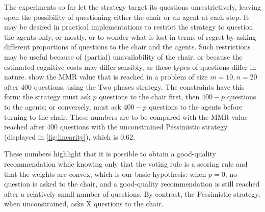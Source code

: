 \documentclass[sigconf, anonymous]{aamas}
\begin{document}

The experiments so far let the strategy target its questions unrestrictively, leaving open the possibility of questioning either the chair or an agent at each step. It may be desired in practical implementations to restrict the strategy to question the agents only, or mostly, or to wonder what is lost in terms of regret by asking different proportions of questions to the chair and the agents. Such restrictions may be useful because of (partial) unavailability of the chair, or because the estimated cognitive costs may differ sensibly, as these types of questions differ in nature.  show the MMR value that is reached in a problem of size $m = 10, n = 20$ after $400$ questions, using the Two phases strategy. The constraints have this form: the strategy must ask $p$ questions to the chair first, then $400 - p$ questions to the agents; or conversely, must ask $400 - p$ questions to the agents before turning to the chair. These numbers are to be compared with the MMR value reached after 400 questions with the unconstrained Pessimistic strategy (displayed in \cref{fig:linearity}), which is $0.62$.%

These numbers highlight that it is possible to obtain a good-quality recommendation while knowing only that the voting rule is a scoring rule and that the weights are convex, which is our basic hypothesis: when $p = 0$, no question is asked to the chair, and a good-quality recommendation is still reached after a relatively small number of questions. By contrast, the Pessimistic strategy, when unconstrained, asks X questions to the chair.
\end{document}
